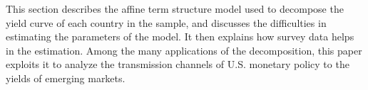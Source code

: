 This section describes the affine term structure model used to decompose 
the yield curve of each country in the sample, and discusses the difficulties in estimating the parameters of the model.
It then explains how survey data helps in the estimation.
Among the many applications of the decomposition, %
this paper exploits it to analyze the transmission channels of U.S. monetary policy to the yields of emerging markets. %

